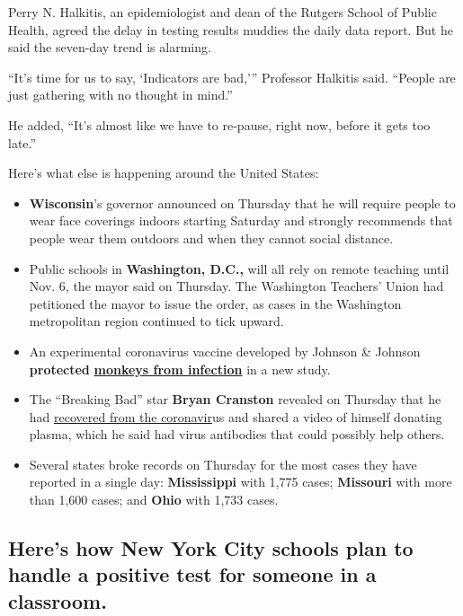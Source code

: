 Perry N. Halkitis, an epidemiologist and dean of the Rutgers School of
Public Health, agreed the delay in testing results muddies the daily
data report. But he said the seven-day trend is alarming.

``It's time for us to say, `Indicators are bad,''' Professor Halkitis
said. ``People are just gathering with no thought in mind.''

He added, ``It's almost like we have to re-pause, right now, before it
gets too late.''

Here's what else is happening around the United States:

\begin{itemize}
\item
  \textbf{Wisconsin}'s governor announced on Thursday that he will
  require people to wear face coverings indoors starting Saturday and
  strongly recommends that people wear them outdoors and when they
  cannot social distance.
\item
  Public schools in \textbf{Washington, D.C.,} will all rely on remote
  teaching until Nov. 6, the mayor said on Thursday. The Washington
  Teachers' Union had petitioned the mayor to issue the order, as cases
  in the Washington metropolitan region continued to tick upward.
\end{itemize}

\begin{itemize}
\item
  An experimental coronavirus vaccine developed by Johnson \& Johnson
  \textbf{protected}
  \textbf{\href{https://www.nytimes.com/2020/07/30/health/covid-19-vaccine-monkeys.html}{monkeys
  from infection}} in a new study.
\item
  The ``Breaking Bad'' star \textbf{Bryan Cranston} revealed on Thursday
  that he had
  \href{https://www.nytimes.com/2020/07/31/arts/television/bryan-cranston-coronavirus-plasma.html}{recovered
  from the coronavir}us and shared a video of himself donating plasma,
  which he said had virus antibodies that could possibly help others.
\item
  Several states broke records on Thursday for the most cases they have
  reported in a single day: \textbf{Mississippi} with 1,775 cases;
  \textbf{Missouri} with more than 1,600 cases; and \textbf{Ohio} with
  1,733 cases.
\end{itemize}

\hypertarget{heres-how-new-york-city-schools-plan-to-handle-a-positive-test-for-someone-in-a-classroom}{%
\subsection{Here's how New York City schools plan to handle a positive
test for someone in a
classroom.}\label{heres-how-new-york-city-schools-plan-to-handle-a-positive-test-for-someone-in-a-classroom}}

